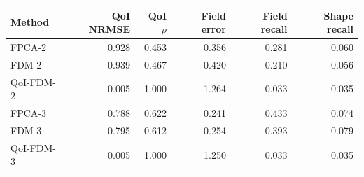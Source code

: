 \begin{tabular}{lrrrrr}
\toprule
Method & QoI NRMSE & QoI $\rho$ & Field error & Field recall & Shape recall\\
\midrule
FPCA-2 & 0.928 & 0.453 & 0.356 & 0.281 & 0.060\\
FDM-2 & 0.939 & 0.467 & 0.420 & 0.210 & 0.056\\
QoI-FDM-2 & 0.005 & 1.000 & 1.264 & 0.033 & 0.035\\
FPCA-3 & 0.788 & 0.622 & 0.241 & 0.433 & 0.074\\
FDM-3 & 0.795 & 0.612 & 0.254 & 0.393 & 0.079\\
QoI-FDM-3 & 0.005 & 1.000 & 1.250 & 0.033 & 0.035\\
\bottomrule
\end{tabular}
